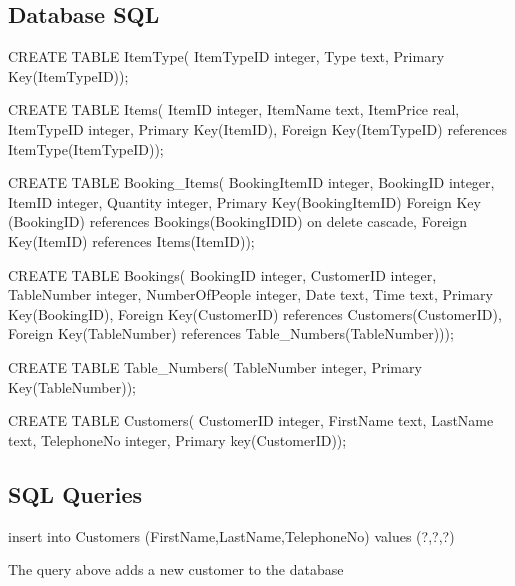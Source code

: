 \newpage
\subsection{Database SQL}

\begin{sql}
CREATE TABLE ItemType(
    ItemTypeID integer,
    Type text,
    Primary Key(ItemTypeID));
\end{sql}

\begin{sql}
CREATE TABLE Items(
             ItemID integer,
             ItemName text,
             ItemPrice real,
             ItemTypeID integer,
             Primary Key(ItemID),
             Foreign Key(ItemTypeID) references ItemType(ItemTypeID));
\end{sql}

\begin{sql}
CREATE TABLE Booking_Items(
    BookingItemID integer,
    BookingID integer,
    ItemID  integer,
    Quantity integer,
    Primary Key(BookingItemID)
    Foreign Key (BookingID) references Bookings(BookingIDID) on delete cascade,
    Foreign Key(ItemID) references Items(ItemID));
\end{sql}

\begin{sql}
CREATE TABLE Bookings(
	BookingID integer,
             CustomerID integer,
             TableNumber integer,
             NumberOfPeople integer,
             Date text,
             Time text,
             Primary Key(BookingID),
             Foreign Key(CustomerID) references Customers(CustomerID),
             Foreign Key(TableNumber) references Table_Numbers(TableNumber)));
\end{sql}

\begin{sql}
CREATE TABLE Table_Numbers(
    TableNumber integer,
    Primary Key(TableNumber));
\end{sql}

\begin{sql}
CREATE TABLE Customers(
             CustomerID integer,
             FirstName text,
             LastName text,
             TelephoneNo integer,
             Primary key(CustomerID));
\end{sql}

\subsection{SQL Queries}


\begin{sql}
insert into Customers (FirstName,LastName,TelephoneNo) values (?,?,?)
\end{sql}
The query above adds a new customer to the database \\ \\


